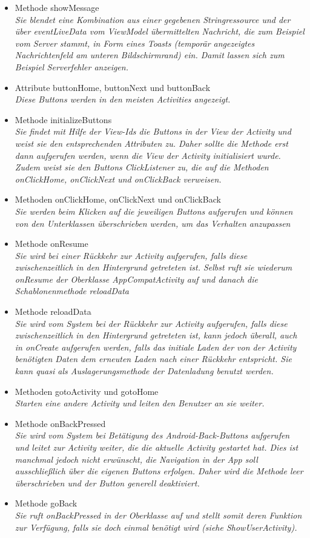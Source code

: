 \documentclass[a4paper]{scrreprt}
\begin{document}
\begin{itemize}
\item Methode showMessage\\
\textit{Sie blendet eine Kombination aus einer gegebenen Stringressource und der über eventLiveData vom ViewModel übermittelten Nachricht, die zum Beispiel vom Server stammt, in Form eines Toasts (temporär angezeigtes Nachrichtenfeld am unteren Bildschirmrand) ein. Damit lassen sich zum Beispiel Serverfehler anzeigen.}
\item Attribute buttonHome, buttonNext und buttonBack\\
\textit{Diese Buttons werden in den meisten Activities angezeigt.}
\item Methode initializeButtons\\
\textit{Sie findet mit Hilfe der View-Ids die Buttons in der View der Activity und weist sie den entsprechenden Attributen zu. Daher sollte die Methode erst dann aufgerufen werden, wenn die View der Activity initialisiert wurde. Zudem weist sie den Buttons ClickListener zu, die auf die Methoden onClickHome, onClickNext und onClickBack verweisen.}
\item Methoden onClickHome, onClickNext und onClickBack\\
\textit{Sie werden beim Klicken auf die jeweiligen Buttons aufgerufen und können von den Unterklassen überschrieben werden, um das Verhalten anzupassen}
\item Methode onResume\\
\textit{Sie wird bei einer Rückkehr zur Activity aufgerufen, falls diese zwischenzeitlich in den Hintergrund getreteten ist. Selbst ruft sie wiederum onResume der Oberklasse AppCompatActivity auf und danach die Schablonenmethode reloadData}
\item Methode reloadData\\
\textit{Sie wird vom System bei der Rückkehr zur Activity aufgerufen, falls diese zwischenzeitlich in den Hintergrund getreteten ist, kann jedoch überall, auch in onCreate aufgerufen werden, falls das initiale Laden der von der Activity benötigten Daten dem erneuten Laden nach einer Rückkehr entspricht. Sie kann quasi als Auslagerungsmethode der Datenladung benutzt werden.}
\item Methoden gotoActivity und gotoHome\\
\textit{Starten eine andere Activity und leiten den Benutzer an sie weiter.}
\item Methode onBackPressed\\
\textit{Sie wird vom System bei Betätigung des Android-Back-Buttons aufgerufen und leitet zur Activity weiter, die die aktuelle Activity gestartet hat. Dies ist manchmal jedoch nicht erwünscht, die Navigation in der App soll ausschließlich über die eigenen Buttons erfolgen. Daher wird die Methode leer überschrieben und der Button generell deaktiviert.}
\item Methode goBack\\
\textit{Sie ruft onBackPressed in der Oberklasse auf und stellt somit deren Funktion zur Verfügung, falls sie doch einmal benötigt wird (siehe ShowUserActivity).}
\end{itemize}
\end{document}
